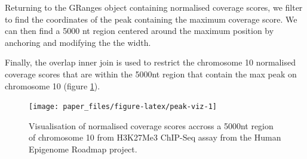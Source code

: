 \documentclass[10pt,letterpaper]{article}
\newenvironment{Shaded}{\begin{snugshade}}{\end{snugshade}}
\newcommand{\DataTypeTok}[1]{\textcolor[rgb]{0.13,0.29,0.53}{#1}}
\newcommand{\DecValTok}[1]{\textcolor[rgb]{0.00,0.00,0.81}{#1}}
\newcommand{\KeywordTok}[1]{\textcolor[rgb]{0.13,0.29,0.53}{\textbf{#1}}}
\newcommand{\NormalTok}[1]{#1}
\newcommand{\OperatorTok}[1]{\textcolor[rgb]{0.81,0.36,0.00}{\textbf{#1}}}
\newcommand{\StringTok}[1]{\textcolor[rgb]{0.31,0.60,0.02}{#1}}
\begin{document}
\begin{Shaded}
\end{Shaded}

Returning to the GRanges object containing normalised coverage scores,
we filter to find the coordinates of the peak containing the maximum
coverage score. We can then find a 5000 nt region centered around the
maximum position by anchoring and modifying the the width.

\begin{Shaded}
\end{Shaded}

Finally, the overlap inner join is used to restrict the chromosome 10
normalised coverage scores that are within the 5000nt region that
contain the max peak on chromosome 10 (figure \ref{fig:peak-viz}).

\begin{Shaded}
\end{Shaded}

\begin{figure}

{\centering \texttt{[image: paper\_files/figure-latex/peak-viz-1]} 

}

\caption{Visualisation of normalised coverage scores accross a 5000nt region of chromosome 10 from H3K27Me3 ChIP-Seq assay from the Human Epigenome Roadmap project.}\label{fig:peak-viz}
\end{figure}
\end{document}
